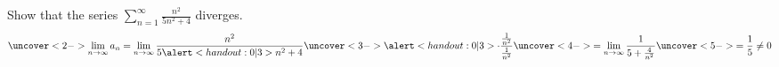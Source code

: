\begin{frame}
\begin{example} %
Show that the series $\sum_{n=1}^\infty \frac{n^2}{5n^2+4}$ diverges.
\[
\uncover<2->{%
\lim_{n\to\infty} a_n = \lim_{n\to\infty} \frac{n^2}{5\alert<handout:0| 3>{n^2}+4}\uncover<3->{\alert<handout:0| 3>{\cdot \frac{\frac{1}{n^2}}{\frac{1}{n^2}}}}%
}%
\uncover<4->{%
 = \lim_{n\to\infty} \frac{1}{5+\frac{4}{n^2}} %
}%
\uncover<5->{%
 = \frac{1}{5} \neq 0%
}%
\]
%
\end{example}
\end{frame}
